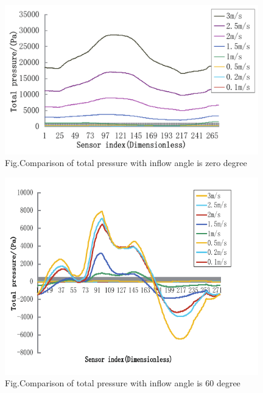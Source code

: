     \begin{figure}[!htp]
        \centering
        \includegraphics[width=11cm]{figure/chap3/fig6a_pressure_0.pdf}
        \label{fig:chap3:F13}
         {Fig.}{Comparison of total pressure with inflow angle is zero degree}
    \end{figure}
    \begin{figure}[!htp]
        \centering
        \includegraphics[width=11cm]{figure/chap3/fig6b_pressure_60.pdf}
        \label{fig:chap3:F14}
         {Fig.}{Comparison of total pressure with inflow angle is 60 degree}
    \end{figure}

